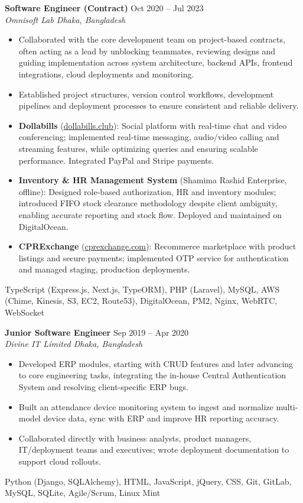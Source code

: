 \documentclass[a4paper,10pt]{article}
\begin{document}
\textbf{Software Engineer (Contract)} \hfill Oct 2020 -- Jul 2023\\[-2pt]
\textit{Omnisoft Lab \textbar{} Dhaka, Bangladesh}\\[-4pt]
\begin{itemize}
  \item Collaborated with the core development team on project-based contracts, often acting as a lead by unblocking teammates, reviewing designs and guiding implementation across system architecture, backend APIs, frontend integrations, cloud deployments and monitoring.
  \item Established project structures, version control workflows, development pipelines and deployment processes to ensure consistent and reliable delivery.
  \item \textbf{Dollabills} (\href{https://dollabills.club}{dollabills.club}): Social platform with real-time chat and video conferencing; implemented real-time messaging, audio/video calling and streaming features, while optimizing queries and ensuring scalable performance. Integrated PayPal and Stripe payments.
  \item \textbf{Inventory \& HR Management System} (Shamima Rashid Enterprise, offline): Designed role-based authorization, HR and inventory modules; introduced FIFO stock clearance methodology despite client ambiguity, enabling accurate reporting and stock flow. Deployed and maintained on DigitalOcean.
  \item \textbf{CPRExchange} (\href{https://cprexchange.com}{cprexchange.com}): Recommerce marketplace with product listings and secure payments; implemented OTP service for authentication and managed staging, production deployments.
\end{itemize}
{\footnotesize\textsf{TypeScript (Express.js, Next.js, TypeORM), PHP (Laravel), MySQL, AWS (Chime, Kinesis, S3, EC2, Route53), DigitalOcean, PM2, Nginx, WebRTC, WebSocket}}

\vspace{2pt}
\newpage
\textbf{Junior Software Engineer} \hfill Sep 2019 -- Apr 2020\\[-2pt]
\textit{Divine IT Limited \textbar{} Dhaka, Bangladesh}\\[-4pt]
\begin{itemize}
  \item Developed ERP modules, starting with CRUD features and later advancing to core engineering tasks, integrating the in-house Central Authentication System and resolving client-specific ERP bugs.
  \item Built an attendance device monitoring system to ingest and normalize multi-model device data, sync with ERP and improve HR reporting accuracy.
  \item Collaborated directly with business analysts, product managers, IT/deployment teams and executives; wrote deployment documentation to support cloud rollouts.
\end{itemize}
{\footnotesize\textsf{Python (Django, SQLAlchemy), HTML, JavaScript, jQuery, CSS, Git, GitLab, MySQL, SQLite, Agile/Scrum, Linux Mint}}
\end{document}
